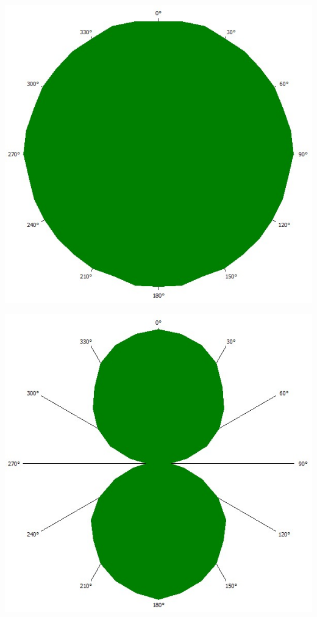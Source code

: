 \documentclass[german,  %
parskip=full,  %
]{scrartcl}
\begin{document}
\begin{minipage}{0.48 \textwidth} \centering
\includegraphics[scale=0.3]{445_l1_linker_Peak.jpg}
\end{minipage}
\begin{minipage}{0.48 \textwidth} \centering
\includegraphics[scale=0.3]{445_l1_rechter_Peak.jpg}
\end{minipage}
\end{document}
